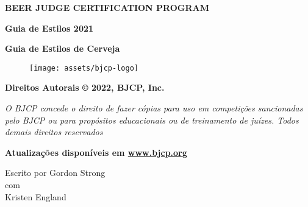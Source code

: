 \begin{titlepage}

    \centering
        {\fontsize{20}{32}\selectfont \textbf{BEER JUDGE CERTIFICATION PROGRAM}}\\

        \vspace{0.8cm}

        {\fontsize{30}{38}\selectfont \textbf{Guia de Estilos 2021 }}\\

        \vspace{0.8cm}

        {\fontsize{26}{32}\selectfont \textbf{Guia de Estilos de Cerveja}}\\

        \begin{figure}[htp]
            \centering
            \texttt{[image: assets/bjcp-logo]}
            \label{fig:bjcp-logo}
        \end{figure}

        {\fontsize{12}{32}\selectfont \textbf{Direitos Autorais © 2022, BJCP, Inc.}}\\

        \vspace{0.4cm}

        {\fontsize{10}{32}\selectfont\textit{
            O BJCP concede o direito de fazer cópias para uso em competições sancionadas \break
            pelo BJCP ou para propósitos educacionais ou de treinamento de juízes.\break
            Todos demais direitos reservados
        }}\\

        \vspace{0.4cm}

        {\fontsize{12}{32}\selectfont \textbf{Atualizações disponíveis em \href{http://www.bjcp.org}{www.bjcp.org}}}\\

        \vspace{0.4cm}

        {\fontsize{12}{32}\selectfont Escrito por Gordon Strong}\\
        {\fontsize{9}{32}\selectfont com}\\
        {\fontsize{10}{32}\selectfont Kristen England}\\

        \vspace{0.5cm}


\end{titlepage}
